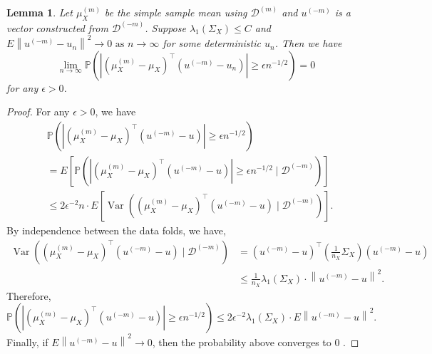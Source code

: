 \documentclass[11pt]{article}
\newtheorem{lemma}[theorem]{Lemma}
\begin{document}
\begin{lemma}\label{lemma: cross term is small}
    Let $\mu_X^{(m)}$ be the simple sample mean using $\mathcal{D}^{(m)}$ and $u^{(-m)}$ is a vector constructed from $\mathcal{D}^{(-m)}$. Suppose $\lambda_1(\Sigma_X) \leq C$ and $E\left\|u^{(-m)}-u_n\right\|^2 \rightarrow 0 \text { as } n \rightarrow \infty$ for some deterministic $u_n$. Then we have 
    \begin{equation*}
        \lim _{n \rightarrow \infty} \mathbb{P}\left(\left|\left(\mu_X^{(m)}-\mu_X\right)^{\top}\left(u^{(-m)}-u_n\right)\right| \geq \epsilon n^{-1 / 2}\right)=0 
    \end{equation*}
    for any $\epsilon >0$.
\end{lemma}
\begin{proof}
For any $\epsilon>0$, we have
\begin{equation*}
\begin{aligned}
& \mathbb{P}\left(\left|\left(\mu_X^{(m)}-\mu_X\right)^{\top}\left(u^{(-m)}-u\right)\right| \geq \epsilon n^{-1 / 2}\right) \\
& =E\left[\mathbb{P}\left(\left|\left(\mu_X^{(m)}-\mu_X\right)^{\top}\left(u^{(-m)}-u\right)\right| \geq \epsilon n^{-1 / 2} \mid \mathcal{D}^{(-m)}\right)\right] \\
& \leq 2 \epsilon^{-2} n \cdot E\left[\operatorname{Var}\left(\left(\mu_X^{(m)}-\mu_X\right)^{\top}\left(u^{(-m)}-u\right) \mid \mathcal{D}^{(-m)}\right)\right] .
\end{aligned}
\end{equation*}
By independence between the data folds, we have,
\begin{equation*}
\begin{aligned}
\operatorname{Var}\left(\left(\mu_X^{(m)}-\mu_X\right)^{\top}\left(u^{(-m)}-u\right) \mid \mathcal{D}^{(-m)}\right) & =\left(u^{(-m)}-u\right)^{\top}\left(\frac{1}{n_X} \Sigma_X\right)\left(u^{(-m)}-u\right) \\
& \leq \frac{1}{n_X} \lambda_1\left(\Sigma_X\right) \cdot\left\|u^{(-m)}-u\right\|^2 .
\end{aligned}
\end{equation*}
Therefore,
\begin{equation*}
\mathbb{P}\left(\left|\left(\mu_X^{(m)}-\mu_X\right)^{\top}\left(u^{(-m)}-u\right)\right| \geq \epsilon n^{-1 / 2}\right) \leq 2 \epsilon^{-2} \lambda_1\left(\Sigma_X\right) \cdot E\left\|u^{(-m)}-u\right\|^2 .
\end{equation*}
Finally, if $E\left\|u^{(-m)}-u\right\|^2 \rightarrow 0$, then the probability above converges to 0 .
\end{proof}
\end{document}
